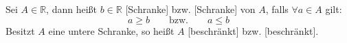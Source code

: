 Sei $A \in \mathbb{R}$, dann heißt $b \in \mathbb{R}$ [Schranke] bzw. [Schranke] von $A$, falls $\forall a \in A$ gilt:
$$a \geq b \qquad \text{bzw.} \qquad a \leq b$$
Besitzt $A$ eine untere Schranke, so heißt $A$ [beschränkt] bzw. [beschränkt].